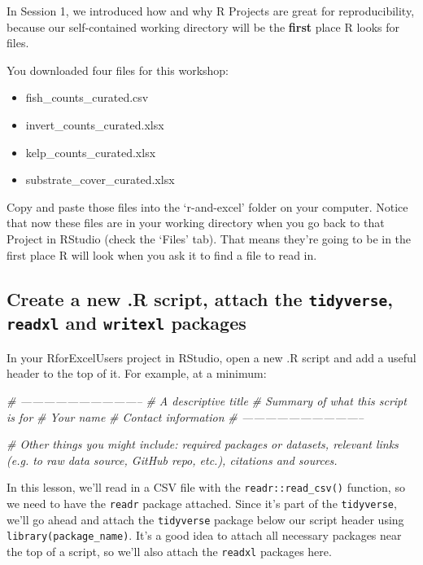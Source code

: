 \documentclass[]{book}
\newenvironment{Shaded}{\begin{snugshade}}{\end{snugshade}}
\newcommand{\CommentTok}[1]{\textcolor[rgb]{0.56,0.35,0.01}{\textit{#1}}}
\providecommand{\tightlist}{%
  \setlength{\itemsep}{0pt}\setlength{\parskip}{0pt}}
\begin{document}
In Session 1, we introduced how and why R Projects are great for reproducibility, because our self-contained working directory will be the \textbf{first} place R looks for files.

You downloaded four files for this workshop:

\begin{itemize}
\tightlist
\item
  fish\_counts\_curated.csv
\item
  invert\_counts\_curated.xlsx
\item
  kelp\_counts\_curated.xlsx
\item
  substrate\_cover\_curated.xlsx
\end{itemize}

Copy and paste those files into the `r-and-excel' folder on your computer. Notice that now these files are in your working directory when you go back to that Project in RStudio (check the `Files' tab). That means they're going to be in the first place R will look when you ask it to find a file to read in.

\hypertarget{create-a-new-.r-script-attach-the-tidyverse-readxl-and-writexl-packages}{%
\subsection{\texorpdfstring{Create a new .R script, attach the \texttt{tidyverse}, \texttt{readxl} and \texttt{writexl} packages}{Create a new .R script, attach the tidyverse, readxl and writexl packages}}\label{create-a-new-.r-script-attach-the-tidyverse-readxl-and-writexl-packages}}

In your RforExcelUsers project in RStudio, open a new .R script and add a useful header to the top of it. For example, at a minimum:

\begin{Shaded}
\begin{Highlighting}[]
\CommentTok{# --------------------------------}
\CommentTok{# A descriptive title}
\CommentTok{# Summary of what this script is for }
\CommentTok{# Your name}
\CommentTok{# Contact information}
\CommentTok{# --------------------------------}

\CommentTok{# Other things you might include: required packages or datasets, relevant links (e.g. to raw data source, GitHub repo, etc.), citations and sources.}
\end{Highlighting}
\end{Shaded}

In this lesson, we'll read in a CSV file with the \texttt{readr::read\_csv()} function, so we need to have the \texttt{readr} package attached. Since it's part of the \texttt{tidyverse}, we'll go ahead and attach the \texttt{tidyverse} package below our script header using \texttt{library(package\_name)}. It's a good idea to attach all necessary packages near the top of a script, so we'll also attach the \texttt{readxl} packages here.
\end{document}
